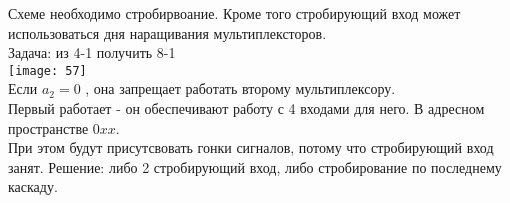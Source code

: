 Схеме необходимо стробирвоание. Кроме того стробирующий вход может использоваться дня наращивания мультиплексторов.\\
Задача: из 4-1 получить 8-1\\
\texttt{[image: 57]}\\


Если $a_2 = 0$ , она запрещает работать второму мультиплексору.\\
Первый работает - он обеспечивают работу с 4 входами для него. В адресном пространстве $0xx$. \\
При этом будут присутсвовать гонки сигналов, потому что стробирующий вход занят.
Решение: либо 2 стробирующий вход, либо стробирование по последнему каскаду.
